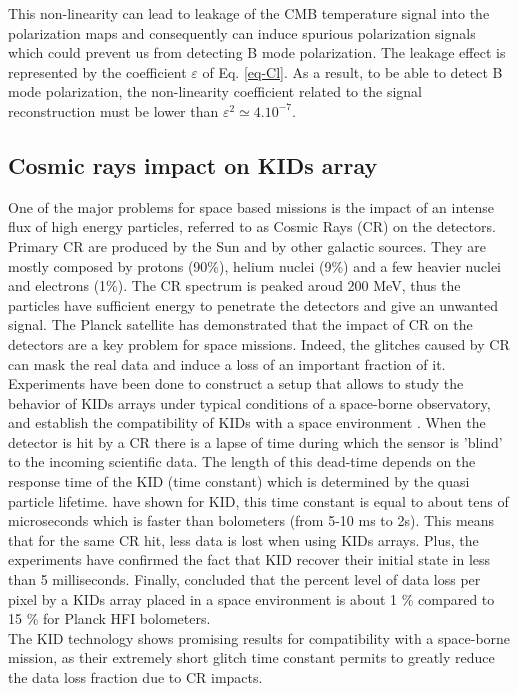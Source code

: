 This non-linearity can lead to leakage of the CMB temperature signal into the polarization maps and consequently can induce spurious polarization signals which could prevent us from detecting B mode polarization. The leakage effect is represented by the coefficient $\varepsilon$ of Eq. \ref{eq-Cl}. As a result, to be able to detect B mode polarization, the non-linearity coefficient related to the signal reconstruction must be lower than $\varepsilon^{2} \simeq 4.10^{-7}$.


\subsection{Cosmic rays impact on KIDs array}

One of the major problems for space based missions is the impact of an intense flux of high energy particles, referred to as Cosmic Rays (CR) on the detectors. Primary CR are produced by the Sun and by other galactic sources. They are mostly composed by protons (90\%), helium nuclei (9\%) and a few heavier nuclei and electrons (1\%). The CR spectrum is peaked aroud 200 MeV, thus the particles have sufficient energy to penetrate the detectors and give an unwanted signal. The Planck satellite \citep{2014A&A...571A..10P} has demonstrated that the impact of CR on the detectors are a key problem for space missions. Indeed, the glitches caused by CR can mask the real data and induce a loss of an important fraction of it.\\
Experiments have been done to construct a setup that allows to study the behavior of KIDs arrays under typical conditions of a space-borne observatory, and establish the compatibility of KIDs with a space environment \citep{2016A&A...592A..26C,2016SPIE.9914E..0NM}. When the detector is hit by a CR there is a lapse of time during which the sensor is 'blind' to the incoming scientific data. The length of this dead-time depends on the response time of the KID (time constant) which is determined by the quasi particle lifetime. \citet{2012ApPhL.100w2601M} have shown for KID, this time constant is equal to about tens of microseconds which is faster than bolometers (from 5-10 ms to 2s). This means that for the same CR hit, less data is lost when using KIDs arrays. Plus, the experiments have confirmed the fact that KID recover their initial state in less than 5 milliseconds. Finally, \citet{2016SPIE.9914E..0NM} concluded that the percent level of data loss per pixel by a KIDs array placed in a space environment is about 1 \% compared to 15 \% for Planck HFI bolometers.\\ The KID technology shows promising results for compatibility with a space-borne mission, as their extremely short glitch time constant permits to greatly reduce the data loss fraction due to CR impacts. 

